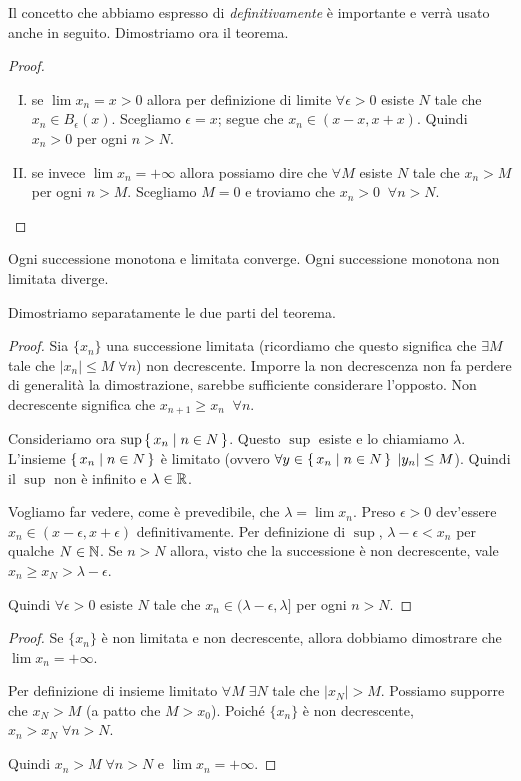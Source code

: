Il concetto che abbiamo espresso di \emph{definitivamente} è importante e verrà usato anche in seguito. Dimostriamo ora il teorema.

\begin{proof} \hfill
\begin{enumerate}[I.]
\item se $\lim x_n = x > 0$ allora per definizione di limite $\forall \epsilon > 0$ esiste $N$ tale che $x_n \in B_{\epsilon}(x)$. Scegliamo $\epsilon = x$; segue che $x_n \in (x-x, x+x)$. Quindi $x_n > 0$ per ogni $n > N$.
\item se invece $\lim x_n = +\infty$ allora possiamo dire che $\forall M$ esiste $N$ tale che $x_n > M$ per ogni $n > M$. Scegliamo $M = 0$ e troviamo che $x_n > 0 \; \; \forall n > N$.
\end{enumerate}
\end{proof}

\begin{theorem}
Ogni successione monotona e limitata converge. Ogni successione monotona non limitata diverge. 
\end{theorem}

Dimostriamo separatamente le due parti del teorema.

\begin{proof}
Sia $\{x_n\}$ una successione limitata (ricordiamo che questo significa che $\exists M$ tale che $|x_n| \le M \; \forall n$) non decrescente. Imporre la non decrescenza non fa perdere di generalità la dimostrazione, sarebbe sufficiente considerare l'opposto. Non decrescente significa che $x_{n+1} \ge x_n \;\; \forall n$.

Consideriamo ora $\sup \set{x_n | n \in N}$. Questo $\sup$ esiste e lo chiamiamo $\lambda$. L'insieme $\set{x_n | n \in N}$ è limitato (ovvero $\forall y \in \set{x_n | n \in N} \; |y_n| \le M$). Quindi il $\sup$ non è infinito e $\lambda \in \mathbb R$.

Vogliamo far vedere, come è prevedibile, che $\lambda = \lim x_n$. Preso $\epsilon > 0$ dev'essere $x_n \in (x-\epsilon, x+\epsilon)$ definitivamente. Per definizione di $\sup$, $\lambda - \epsilon < x_n$ per qualche $N \in \mathbb N$. Se $n > N$ allora, visto che la successione è non decrescente, vale $x_n \ge x_N > \lambda - \epsilon$.

Quindi $\forall \epsilon > 0$ esiste $N$ tale che $x_n \in (\lambda - \epsilon, \lambda]$ per ogni $n > N$.
\end{proof}

\begin{proof}
Se $\{x_n\}$ è non limitata e non decrescente, allora dobbiamo dimostrare che $\lim x_n = +\infty$.

Per definizione di insieme limitato $\forall M \; \exists N$ tale che $|x_N|>M$. Possiamo supporre che $x_N > M$ (a patto che $M > x_0$). Poiché $\{x_n\}$ è non decrescente, $x_n > x_N \; \forall n > N$.

Quindi $x_n > M \; \forall n > N$ e $\lim x_n = +\infty$.
\end{proof}

